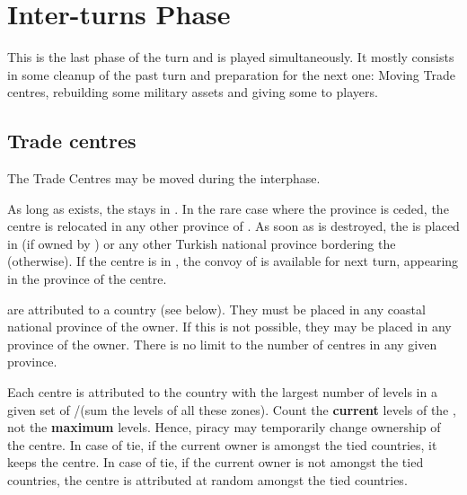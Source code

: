 \chapter{Inter-turns Phase}\label{chapter:Inter}



This is the last phase of the turn and is played simultaneously. It mostly
consists in some cleanup of the past turn and preparation for the next one:
Moving Trade centres, rebuilding some military assets and giving some \VPs to
players.

\aparag[Sequence.]
\InterDetails

\section{Trade centres}\label{chInter:Trade Centres}

\aparag The Trade Centres may be moved during the interphase.

 As long as \paysEgypte exists, the 
stays in \provinceNil. In the rare case where the province is ceded, the
centre is relocated in any other province of \paysEgypte.
\bparag As soon as \paysEgypte is destroyed, the  is placed
in \provinceIzmir (if owned by \TUR) or any other Turkish national province
bordering the \regionMediterrannee (otherwise).
\bparag If the centre is in \TUR, the convoy of  is available for
next turn, appearing in the province of the centre.

 are attributed to a country (see below).
\bparag They must be placed in any coastal national province of the owner.
\bparag If this is not possible, they may be placed in any province of the
owner.
\bparag There is no limit to the number of centres in any given province.

\aparag[Attribution] Each centre is attributed to the country with the largest
number of \TradeFLEET levels in a given set of \STZ/\CTZ (sum the levels of
all these zones).
\bparag Count the \textbf{current} levels of the \TradeFLEET, not the
\textbf{maximum} levels. Hence, piracy may temporarily change ownership of the
centre.
\bparag In case of tie, if the current owner is amongst the tied countries, it
keeps the centre.
\bparag In case of tie, if the current owner is not amongst the tied
countries, the centre is attributed at random amongst the tied countries.

